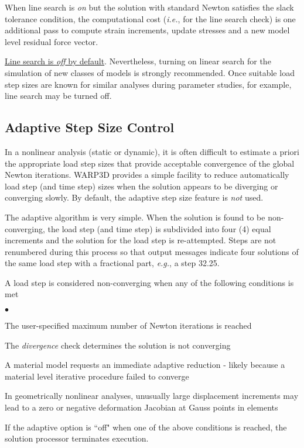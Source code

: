 \documentclass[11pt]{report}
\numberwithin{equation}{section}
\newcommand{\nin} {\noindent}
\newcommand{\ul} {\underline}
\newcommand{\eg}{\emph{e.g.},\xspace}
\newcommand{\ie}{\emph{i.e.},\xspace}
\newcommand{\ti}{\emph}
\newcommand{\squishlist}{
 \begin{list}{$\bullet$}
  { \setlength{\itemsep}{0pt}
     \setlength{\parsep}{3pt}
     \setlength{\topsep}{3pt}
     \setlength{\partopsep}{0pt}
     \setlength{\leftmargin}{1.5em}
     \setlength{\labelwidth}{1em}
     \setlength{\labelsep}{0.5em} } }
\newcommand{\squishend}{
  \end{list}  }
\begin{document}
\nin When line search is \ti{on} but the solution with standard
Newton satisfies the slack tolerance condition, the computational cost
(\ie for the line search check) 
is one additional pass to compute strain increments, update stresses and
a new model level residual force vector.

\nin \ul{Line search is \ti{off} by default}. Nevertheless, turning on linear 
search for the simulation of new classes of models is strongly recommended.
Once suitable load step sizes are known for similar analyses
during parameter studies, for example, line search may be turned off.


\subsection{Adaptive Step Size Control}
\nin In a nonlinear analysis (static or dynamic), it is often difficult to estimate a priori the 
appropriate load step sizes that provide acceptable convergence of the 
global Newton iterations. 
WARP3D provides a simple facility to reduce automatically load step (and time step) 
sizes when the solution appears to be diverging or converging slowly.  By default, the 
adaptive step size feature is \ti{not} used.

The adaptive algorithm is very simple. When the solution is found to be non-converging,
the load step (and time step) is subdivided 
into four (4) equal increments and the solution for the load step is re-attempted. Steps are not 
renumbered during this process so that output messages indicate four solutions of the 
same load step with a fractional part, \eg a step 32.25.

A load step is considered non-converging when any of the following conditions
is met

\squishlist
\item The user-specified maximum number of Newton iterations is reached
\item The \ti{divergence} check determines the solution is not converging
\item A material model requests an immediate adaptive reduction - likely because a
material level iterative procedure failed to converge 
\item In geometrically nonlinear analyses, unusually large displacement increments may lead to 
a zero or negative deformation Jacobian at Gauss points in elements
\squishend

If  the adaptive option is ``off" when one of the above conditions is reached,
 the solution processor terminates execution.
\end{document}
